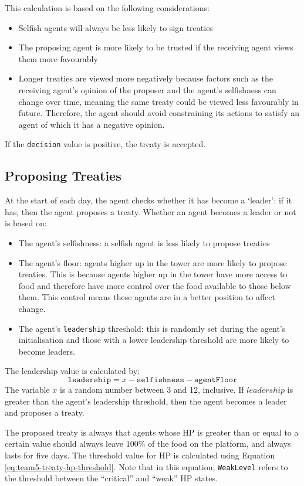 This calculation is based on the following considerations:
\begin{itemize}
    \item Selfish agents will always be less likely to sign treaties
    \item The proposing agent is more likely to be trusted if the receiving agent views them more favourably
    \item Longer treaties are viewed more negatively because factors such as the receiving agent's opinion of the proposer and the agent's selfishness can change over time, meaning the same treaty could be viewed less favourably in future. Therefore, the agent should avoid constraining its actions to satisfy an agent of which it has a negative opinion.
\end{itemize}

If the \texttt{decision} value is positive, the treaty is accepted.

\subsection*{Proposing Treaties}\label{sec:team5-treaties-proposal}
At the start of each day, the agent checks whether it has become a `leader': if it has, then the agent proposes a treaty. Whether an agent becomes a leader or not is based on:
\begin{itemize}
    \item The agent's selfishness: a selfish agent is less likely to propose treaties
    \item The agent's floor: agents higher up in the tower are more likely to propose treaties. This is because agents higher up in the tower have more access to food and therefore have more control over the food available to those below them. This control means these agents are in a better position to affect change.
    \item The agent's \texttt{leadership} threshold: this is randomly set during the agent's initialisation and those with a lower leadership threshold are more likely to become leaders.
\end{itemize}
The leadership value is calculated by:
\[ \texttt{leadership} = x - \texttt{selfishness} - \texttt{agentFloor}\]
The variable $x$ is a random number between 3 and 12, inclusive. If $leadership$ is greater than the agent's leadership threshold, then the agent becomes a leader and proposes a treaty.

The proposed treaty is always that agents whose HP is greater than or equal to a certain value should always leave 100\% of the food on the platform, and always lasts for five days. The threshold value for HP is calculated using Equation \ref{eq:team5-treaty-hp-threshold}. Note that in this equation, \texttt{WeakLevel} refers to the threshold between the ``critical'' and ``weak'' HP states.

